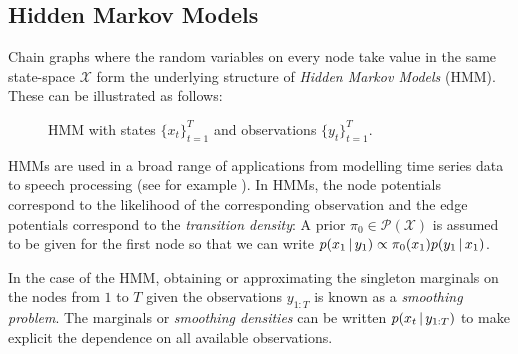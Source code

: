 \subsection{Hidden Markov Models}
Chain graphs where the random variables on every node take value in the same state-space $\mathcal X$ form the underlying structure of \emph{Hidden Markov Models} (HMM). These can be illustrated as follows:
\begin{figure}[!h]
\center
{}
\caption{\label{fig: hmm1} HMM with states $\{x_{t}\}_{t=1}^{T}$ and observations $\{y_{t}\}_{t=1}^{T}$.}
\end{figure}

HMMs are used in a broad range of applications from modelling time series data to speech processing (see for example \citet{ghahramani01, gales07, zucchini16}). In HMMs, the node potentials correspond to the likelihood of the corresponding observation and the edge potentials correspond to the \emph{transition density}:
A prior $\pi_{0}\in\mathcal P(\mathcal X)$ is assumed to be given for the first node so that we can write $p(x_1\,|\, y_{1}) \propto \pi_{0}(x_1)p(y_1\,|\, x_1)$. 

In the case of the HMM, obtaining or approximating the singleton marginals on the nodes from $1$ to $T$ given the observations $y_{1:T}$ is known as a \emph{smoothing problem}. The marginals or \emph{smoothing densities} can be written $p(x_t\,|\, y_{1:T})$ to make explicit the dependence on all available observations.

